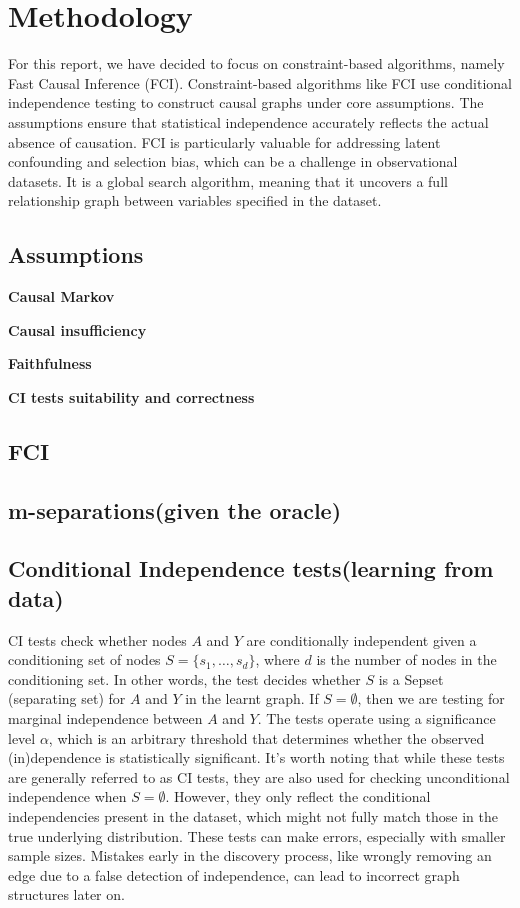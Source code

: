 \documentclass[main.tex]{subfiles}
\begin{document}
\section{Methodology}
For this report, we have decided to focus on constraint-based algorithms, namely Fast Causal Inference (FCI). Constraint-based algorithms like FCI use conditional independence testing to construct causal graphs under core assumptions. The assumptions ensure that statistical independence accurately reflects the actual absence of causation. FCI is particularly valuable for addressing latent confounding and selection bias, which can be a challenge in observational datasets. It is a global search algorithm, meaning that it uncovers a full relationship graph between variables specified in the dataset. 
\subsection{Assumptions}

\textbf{Causal Markov}

\textbf{Causal insufficiency}

\textbf{Faithfulness} 

\textbf{CI tests suitability and correctness}
\subsection{FCI}

\subsection{m-separations(given the oracle)}

\subsection{Conditional Independence tests(learning from data)}
CI tests check whether nodes $A$ and $Y$ are conditionally independent given a conditioning set of nodes $S = \{s_1, \dots, s_d\}$, where $d$ is the number of nodes in the conditioning set. In other words, the test decides whether $S$ is a Sepset (separating set) for $A$ and $Y$ in the learnt graph. If $S = \emptyset$, then we are testing for marginal independence between $A$ and $Y$. The tests operate using a significance level $\alpha$, which is an arbitrary threshold that determines whether the observed (in)dependence is statistically significant. It's worth noting that while these tests are generally referred to as CI tests, they are also used for checking unconditional independence when $S = \emptyset$. However, they only reflect the conditional independencies present in the dataset, which might not fully match those in the true underlying distribution. These tests can make errors, especially with smaller sample sizes. Mistakes early in the discovery process, like wrongly removing an edge due to a false detection of independence, can lead to incorrect graph structures later on. 
\end{document}
